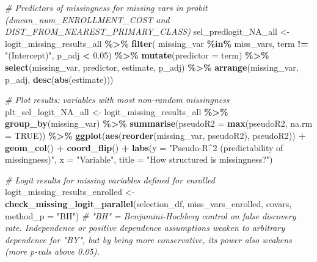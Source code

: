 \documentclass[
]{article}
\newenvironment{Shaded}{\begin{snugshade}}{\end{snugshade}}
\newcommand{\AttributeTok}[1]{\textcolor[rgb]{0.13,0.29,0.53}{#1}}
\newcommand{\CommentTok}[1]{\textcolor[rgb]{0.56,0.35,0.01}{\textit{#1}}}
\newcommand{\ConstantTok}[1]{\textcolor[rgb]{0.56,0.35,0.01}{#1}}
\newcommand{\FloatTok}[1]{\textcolor[rgb]{0.00,0.00,0.81}{#1}}
\newcommand{\FunctionTok}[1]{\textcolor[rgb]{0.13,0.29,0.53}{\textbf{#1}}}
\newcommand{\NormalTok}[1]{#1}
\newcommand{\OtherTok}[1]{\textcolor[rgb]{0.56,0.35,0.01}{#1}}
\newcommand{\SpecialCharTok}[1]{\textcolor[rgb]{0.81,0.36,0.00}{\textbf{#1}}}
\newcommand{\StringTok}[1]{\textcolor[rgb]{0.31,0.60,0.02}{#1}}
\begin{document}
\begin{Shaded}
\begin{Highlighting}[]
\CommentTok{\# Predictors of missingness for missing vars in probit (dmean\_num\_ENROLLMENT\_COST and DIST\_FROM\_NEAREST\_PRIMARY\_CLASS)}
\NormalTok{sel\_predlogit\_NA\_all }\OtherTok{\textless{}{-}}\NormalTok{ logit\_missing\_results\_all }\SpecialCharTok{\%\textgreater{}\%} 
  \FunctionTok{filter}\NormalTok{(}
\NormalTok{    missing\_var }\SpecialCharTok{\%in\%}\NormalTok{ miss\_vars,}
\NormalTok{    term }\SpecialCharTok{!=} \StringTok{"(Intercept)"}\NormalTok{,}
\NormalTok{    p\_adj }\SpecialCharTok{\textless{}} \FloatTok{0.05}\NormalTok{) }\SpecialCharTok{\%\textgreater{}\%} 
  \FunctionTok{mutate}\NormalTok{(}\AttributeTok{predictor =}\NormalTok{ term) }\SpecialCharTok{\%\textgreater{}\%}
  \FunctionTok{select}\NormalTok{(missing\_var, predictor, estimate, p\_adj) }\SpecialCharTok{\%\textgreater{}\%} 
  \FunctionTok{arrange}\NormalTok{(missing\_var, p\_adj, }\FunctionTok{desc}\NormalTok{(}\FunctionTok{abs}\NormalTok{(estimate)))}

\CommentTok{\# Plot results: variables with most non{-}random missingness}
\NormalTok{plt\_sel\_logit\_NA\_all }\OtherTok{\textless{}{-}}\NormalTok{ logit\_missing\_results\_all }\SpecialCharTok{\%\textgreater{}\%}
  \FunctionTok{group\_by}\NormalTok{(missing\_var) }\SpecialCharTok{\%\textgreater{}\%}
  \FunctionTok{summarise}\NormalTok{(}\AttributeTok{pseudoR2 =} \FunctionTok{max}\NormalTok{(pseudoR2, }\AttributeTok{na.rm =} \ConstantTok{TRUE}\NormalTok{)) }\SpecialCharTok{\%\textgreater{}\%}
  \FunctionTok{ggplot}\NormalTok{(}\FunctionTok{aes}\NormalTok{(}\FunctionTok{reorder}\NormalTok{(missing\_var, pseudoR2), pseudoR2)) }\SpecialCharTok{+}
  \FunctionTok{geom\_col}\NormalTok{() }\SpecialCharTok{+}
  \FunctionTok{coord\_flip}\NormalTok{() }\SpecialCharTok{+}
  \FunctionTok{labs}\NormalTok{(}\AttributeTok{y =} \StringTok{"Pseudo{-}R\^{}2 (predictability of missingness)"}\NormalTok{,}
       \AttributeTok{x =} \StringTok{"Variable"}\NormalTok{,}
       \AttributeTok{title =} \StringTok{"How structured is missingness?"}\NormalTok{)}



\CommentTok{\# Logit results for missing variables defined for enrolled}
\NormalTok{logit\_missing\_results\_enrolled }\OtherTok{\textless{}{-}} \FunctionTok{check\_missing\_logit\_parallel}\NormalTok{(selection\_df, miss\_vars\_enrolled, covars, }\AttributeTok{method\_p =} \StringTok{"BH"}\NormalTok{) }\CommentTok{\# "BH" = Benjamini{-}Hochberg control on false discovery rate. Independence or positive dependence assumptions weaken to arbitrary dependence for "BY", but by being more conservative, its power also weakens (more p{-}vals above 0.05).}


\end{Highlighting}
\end{Shaded}
\end{document}
